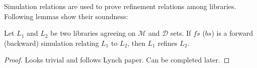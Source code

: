 Simulation relations are used to prove refinement relations among libraries. Following lemmas show their soundness:
\begin{lem}
Let $L_1$ and $L_2$ be two libraries agreeing on $\mathcal{M}$ and $\mathcal{D}$ sets. If $fs$ ($bs$) is a forward (backward) simulation relating $L_1$ to $L_2$, then $L_1$ refines $L_2$.
\end{lem}
\begin{proof}
Looks trivial and follows Lynch paper. Can be completed later.
\end{proof}